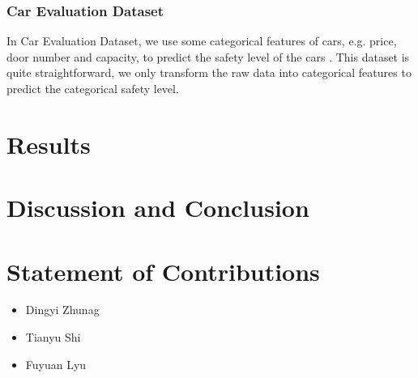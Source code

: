 \documentclass[11pt]{scrartcl}
\begin{document}
\subsubsection*{Car Evaluation Dataset}
In Car Evaluation Dataset, we use some categorical features of cars, e.g. price, door number and capacity, to predict the safety level of the cars \cite{bohanec1988knowledge}. This dataset is quite straightforward, we only transform the raw data into categorical features to predict the categorical safety level.


\section{Results}

\section{Discussion and Conclusion}

\section{Statement of Contributions}

\begin{itemize}
	\item Dingyi Zhunag
	\item Tianyu Shi
	\item Fuyuan Lyu
\end{itemize}



\end{document}
